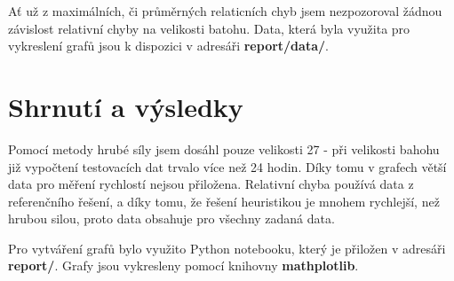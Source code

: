 \documentclass[a4paper,10pt,twocolumn]{article}
\begin{document}
Ať už z maximálních, či průměrných relaticních chyb jsem nezpozoroval žádnou závislost relativní chyby na velikosti batohu. Data, která byla využita pro vykreslení grafů jsou k dispozici v adresáři \textbf{report/data/}.



\section{Shrnutí a výsledky}

Pomocí metody hrubé síly jsem dosáhl pouze velikosti 27 - při velikosti bahohu již vypočtení testovacích dat trvalo více než 24 hodin. Díky tomu v grafech větší data pro měření rychlostí nejsou přiložena. 
Relativní chyba používá data z referenčního řešení, a díky tomu, že řešení heuristikou je mnohem rychlejší, než hrubou silou, proto data obsahuje pro všechny zadaná data.

Pro vytváření grafů bylo využito Python notebooku, který je přiložen v adresáři \textbf{report/}. Grafy jsou vykresleny pomocí knihovny \textbf{mathplotlib}.


\end{document}
